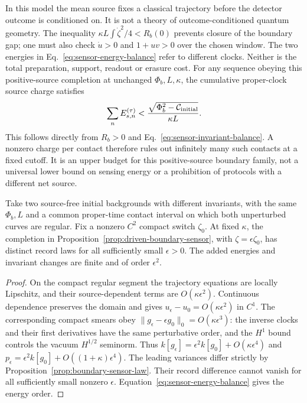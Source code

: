 In this model the mean source fixes a classical trajectory before the detector
outcome is conditioned on. It is not a theory of outcome-conditioned quantum
geometry. The inequality
$\kappa L\int\dot\zeta^2/4<R_b(0)$ prevents closure of the boundary gap;
one must also check $\dot u>0$ and $1+uv>0$ over the chosen window.
The two energies in Eq.~\eqref{eq:sensor-energy-balance} refer to different
clocks. Neither is the total preparation, support, readout or erasure cost.
For any sequence obeying this positive-source completion at unchanged
$\Phi_b,L,\kappa$, the cumulative proper-clock source charge satisfies
\begin{equation}\label{eq:sensor-cumulative-budget}
 \sum_n E_{s,n}^{(\tau)}
 <\frac{\sqrt{\Phi_b^2-\mathcal C_{\rm initial}}}{\kappa L}.
\end{equation}
This follows directly from $R_b>0$ and
Eq.~\eqref{eq:sensor-invariant-balance}. A nonzero charge per contact therefore
rules out infinitely many such contacts at a fixed cutoff. It is an upper
budget for this positive-source boundary family, not a universal lower bound
on sensing energy or a prohibition of protocols with a different net source.

\begin{proposition}
\label{prop:weak-boundary-sensor}
Take two source-free initial backgrounds with different invariants, with the
same $\Phi_b,L$ and a common proper-time contact interval on which both
unperturbed curves are regular. Fix a nonzero $C^2$ compact switch $\zeta_0$.
At fixed $\kappa$, the completion in
Proposition~\ref{prop:driven-boundary-sensor}, with
$\zeta=\epsilon\zeta_0$, has distinct record laws for all sufficiently small
$\epsilon>0$. The added energies and invariant changes are finite and of
order $\epsilon^2$.
\end{proposition}
\begin{proof}
On the compact regular segment the trajectory equations are locally Lipschitz,
and their source-dependent terms are $O(\kappa\epsilon^2)$. Continuous
dependence preserves the domain and gives
$u_\epsilon-u_0=O(\kappa\epsilon^2)$ in $C^1$. The corresponding compact
smears obey
$\|g_\epsilon-\epsilon g_0\|_0=O(\kappa\epsilon^3)$:
the inverse clocks and their first derivatives have the same perturbative
order, and the $H^1$ bound controls the vacuum $H^{1/2}$ seminorm.
Thus $k[g_\epsilon]=\epsilon^2 k[g_0]+O(\kappa\epsilon^4)$ and
$p_\epsilon=\epsilon^2 k[g_0]+O((1+\kappa)\epsilon^4)$.
The leading variances differ strictly by
Proposition~\ref{prop:boundary-sensor-law}. Their record difference cannot
vanish for all sufficiently small nonzero $\epsilon$.
Equation~\eqref{eq:sensor-energy-balance} gives the energy order.
\end{proof}

